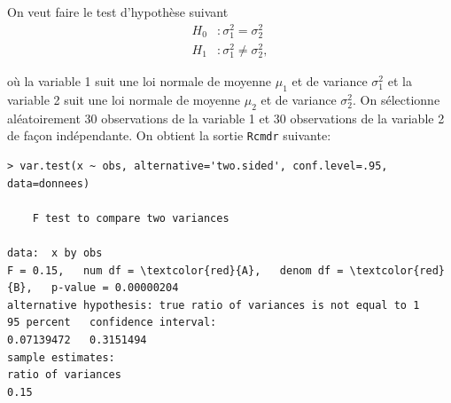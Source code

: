 \begin{questions}
\begin{parts}
\end{parts}

\newpage

\question\label{test2variances}

On veut faire le test d'hypothèse suivant 
\begin{align*}
H_0 &:\sigma_1^2 = \sigma_2^2\\
H_1 &:\sigma_1^2 \neq \sigma_2^2,
\end{align*}

où la variable 1 suit une loi normale de moyenne $\mu_1$ et de variance $\sigma_1^2$ et la variable 2 suit une loi normale de moyenne $\mu_2$ et de variance $\sigma_2^2$. On sélectionne aléatoirement 30 observations de la variable 1 et 30 observations de la variable 2 de façon indépendante. On obtient la sortie \texttt{Rcmdr} suivante:

\begin{Verbatim}[commandchars=\\\{\}]
> var.test(x ~ obs, alternative='two.sided', conf.level=.95, data=donnees)

	F test to compare two variances

data:  x by obs
F = 0.15,   num df = \textcolor{red}{A},   denom df = \textcolor{red}{B},   p-value = 0.00000204
alternative hypothesis: true ratio of variances is not equal to 1
95 percent   confidence interval:
0.07139472   0.3151494
sample estimates:
ratio of variances 
0.15
\end{Verbatim}

\end{questions}
